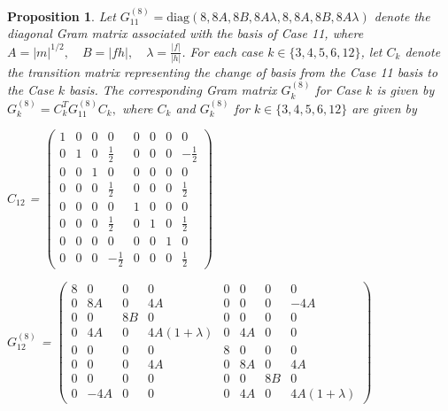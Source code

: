 \documentclass{amsart}
\theoremstyle{plain}
\newtheorem{proposition}[theorem]{Proposition}
\theoremstyle{definition}
\theoremstyle{remark}
\numberwithin{equation}{section}
\begin{document}
\begin{proposition} \label{prop:gram_cases_other}
Let $G_{11}^{(8)}= \text{diag}(8, 8A, 8B, 8A\lambda, 8, 8A, 8B, 8A\lambda)$ denote the diagonal Gram matrix associated with the basis of Case 11, where $A = |m|^{1/2}, \quad B = |fh|, \quad \lambda = \frac{|f|}{|h|}$. For each case $k \in \{3, 4, 5, 6, 12\}$, let $C_k$ denote the transition matrix representing the change of basis from the Case 11 basis to the Case $k$ basis. The corresponding Gram matrix $G_k^{(8)}$ for Case $k$ is given by $G_k^{(8)} = C_k^T G_{11}^{(8)} C_k,$
where $C_k$ and $G_{k}^{(8)}$ for $k\in \{3,4,5,6,12\}$ are given by 


\begin{minipage}[t]{0.4\textwidth}
    \vspace{5pt}
    { $C_{12}$ =  %
    $
    \begin{pmatrix}
    1 & 0 & 0 & 0 & 0 & 0 & 0 & 0 \\
    0 & 1 & 0 & \frac{1}{2} & 0 & 0 & 0 & -\frac{1}{2} \\
    0 & 0 & 1 & 0 & 0 & 0 & 0 & 0 \\
    0 & 0 & 0 & \frac{1}{2} & 0 & 0 & 0 & \frac{1}{2} \\
    0 & 0 & 0 & 0 & 1 & 0 & 0 & 0 \\
    0 & 0 & 0 & \frac{1}{2} & 0 & 1 & 0 & \frac{1}{2} \\
    0 & 0 & 0 & 0 & 0 & 0 & 1 & 0 \\
    0 & 0 & 0 & -\frac{1}{2} & 0 & 0 & 0 & \frac{1}{2} 
    \end{pmatrix}
    $
    }
\end{minipage}
\hfill
\begin{minipage}[t]{0.6\textwidth}
    \centering
    \vspace{5pt}
    {$G_{12}^{(8)}$ =  %
    $
    \begin{pmatrix}
    8 & 0 & 0 & 0 & 0 & 0 & 0 & 0 \\
    0 & 8A & 0 & 4A & 0 & 0 & 0 & -4A \\
    0 & 0 & 8B & 0 & 0 & 0 & 0 & 0 \\
    0 & 4A & 0 & 4A(1+\lambda) & 0 & 4A & 0 & 0 \\
    0 & 0 & 0 & 0 & 8 & 0 & 0 & 0 \\
    0 & 0 & 0 & 4A & 0 & 8A & 0 & 4A \\
    0 & 0 & 0 & 0 & 0 & 0 & 8B & 0 \\
    0 & -4A & 0 & 0 & 0 & 4A & 0 & 4A(1+\lambda)
    \end{pmatrix}
    $
    }
\end{minipage}


\end{proposition}
\end{document}
